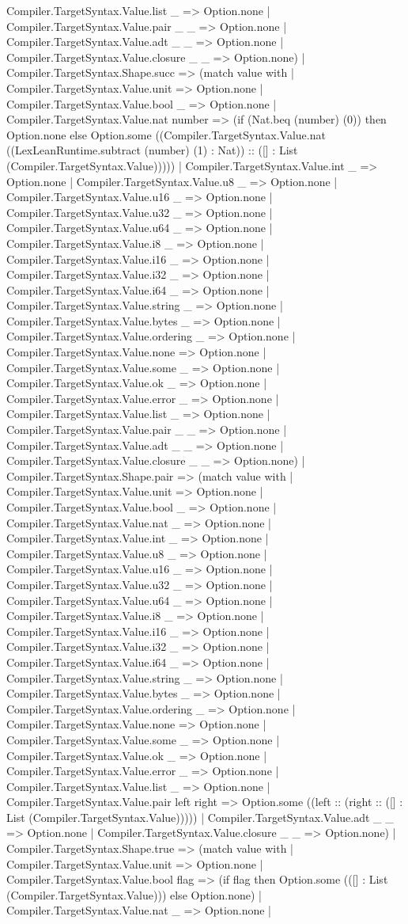 \documentclass[11pt]{article}
\begin{document}
Compiler.TargetSyntax.Value.list \_ => Option.none | Compiler.TargetSyntax.Value.pair \_ \_ => Option.none | Compiler.TargetSyntax.Value.adt \_ \_ => Option.none | Compiler.TargetSyntax.Value.closure \_ \_ => Option.none) | Compiler.TargetSyntax.Shape.succ => (match value with | Compiler.TargetSyntax.Value.unit => Option.none | Compiler.TargetSyntax.Value.bool \_ => Option.none | Compiler.TargetSyntax.Value.nat number => (if (Nat.beq (number) (0)) then Option.none else Option.some ((Compiler.TargetSyntax.Value.nat ((LexLeanRuntime.subtract (number) (1) : Nat)) :: ([] : List (Compiler.TargetSyntax.Value))))) | Compiler.TargetSyntax.Value.int \_ => Option.none | Compiler.TargetSyntax.Value.u8 \_ => Option.none | Compiler.TargetSyntax.Value.u16 \_ => Option.none | Compiler.TargetSyntax.Value.u32 \_ => Option.none | Compiler.TargetSyntax.Value.u64 \_ => Option.none | Compiler.TargetSyntax.Value.i8 \_ => Option.none | Compiler.TargetSyntax.Value.i16 \_ => Option.none | Compiler.TargetSyntax.Value.i32 \_ => Option.none | Compiler.TargetSyntax.Value.i64 \_ => Option.none | Compiler.TargetSyntax.Value.string \_ => Option.none | Compiler.TargetSyntax.Value.bytes \_ => Option.none | Compiler.TargetSyntax.Value.ordering \_ => Option.none | Compiler.TargetSyntax.Value.none => Option.none | Compiler.TargetSyntax.Value.some \_ => Option.none | Compiler.TargetSyntax.Value.ok \_ => Option.none | Compiler.TargetSyntax.Value.error \_ => Option.none | Compiler.TargetSyntax.Value.list \_ => Option.none | Compiler.TargetSyntax.Value.pair \_ \_ => Option.none | Compiler.TargetSyntax.Value.adt \_ \_ => Option.none | Compiler.TargetSyntax.Value.closure \_ \_ => Option.none) | Compiler.TargetSyntax.Shape.pair => (match value with | Compiler.TargetSyntax.Value.unit => Option.none | Compiler.TargetSyntax.Value.bool \_ => Option.none | Compiler.TargetSyntax.Value.nat \_ => Option.none | Compiler.TargetSyntax.Value.int \_ => Option.none | Compiler.TargetSyntax.Value.u8 \_ => Option.none | Compiler.TargetSyntax.Value.u16 \_ => Option.none | Compiler.TargetSyntax.Value.u32 \_ => Option.none | Compiler.TargetSyntax.Value.u64 \_ => Option.none | Compiler.TargetSyntax.Value.i8 \_ => Option.none | Compiler.TargetSyntax.Value.i16 \_ => Option.none | Compiler.TargetSyntax.Value.i32 \_ => Option.none | Compiler.TargetSyntax.Value.i64 \_ => Option.none | Compiler.TargetSyntax.Value.string \_ => Option.none | Compiler.TargetSyntax.Value.bytes \_ => Option.none | Compiler.TargetSyntax.Value.ordering \_ => Option.none | Compiler.TargetSyntax.Value.none => Option.none | Compiler.TargetSyntax.Value.some \_ => Option.none | Compiler.TargetSyntax.Value.ok \_ => Option.none | Compiler.TargetSyntax.Value.error \_ => Option.none | Compiler.TargetSyntax.Value.list \_ => Option.none | Compiler.TargetSyntax.Value.pair left right => Option.some ((left :: (right :: ([] : List (Compiler.TargetSyntax.Value))))) | Compiler.TargetSyntax.Value.adt \_ \_ => Option.none | Compiler.TargetSyntax.Value.closure \_ \_ => Option.none) | Compiler.TargetSyntax.Shape.true => (match value with | Compiler.TargetSyntax.Value.unit => Option.none | Compiler.TargetSyntax.Value.bool flag => (if flag then Option.some (([] : List (Compiler.TargetSyntax.Value))) else Option.none) | Compiler.TargetSyntax.Value.nat \_ => Option.none | 
\end{document}
